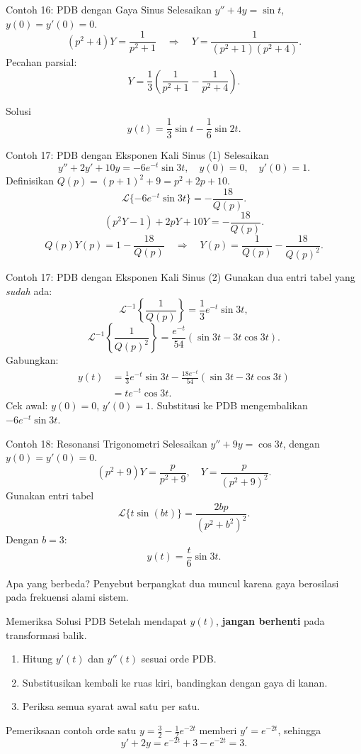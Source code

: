 \documentclass[aspectratio=169,11pt]{beamer}
\newcommand{\Lap}{\mathcal{L}}
\newcommand{\invLap}{\mathcal{L}^{-1}}
\begin{document}
\begin{frame}{Contoh 16: PDB dengan Gaya Sinus}
Selesaikan $y''+4y=\sin t$, $y(0)=y'(0)=0$.
\[
(p^2+4)Y=\frac1{p^2+1}
\quad\Rightarrow\quad
Y=\frac1{(p^2+1)(p^2+4)}.
\]
Pecahan parsial:
\[
Y=\frac13\left(\frac1{p^2+1}-\frac1{p^2+4}\right).
\]
\begin{exampleblock}{Solusi}
\[
\boxed{y(t)=\frac13\sin t-\frac16\sin2t}.
\]
\end{exampleblock}
\end{frame}

\begin{frame}{Contoh 17: PDB dengan Eksponen Kali Sinus (1)}
Selesaikan
\[
y''+2y'+10y=-6e^{-t}\sin3t,
\quad y(0)=0,\quad y'(0)=1.
\]
\small Definisikan $Q(p)=(p+1)^2+9=p^2+2p+10$.
\[
\Lap\{-6e^{-t}\sin3t\}=-\frac{18}{Q(p)}.
\]
\[
(p^2Y-1)+2pY+10Y=-\frac{18}{Q(p)}.
\]
\[
Q(p)Y(p)=1-\frac{18}{Q(p)}
\quad\Longrightarrow\quad
\boxed{Y(p)=\frac1{Q(p)}-\frac{18}{Q(p)^2}}.
\]
\end{frame}

\begin{frame}{Contoh 17: PDB dengan Eksponen Kali Sinus (2)}
Gunakan dua entri tabel yang \emph{sudah} ada:
\[
\invLap\left\{\frac1{Q(p)}\right\}
=\frac13e^{-t}\sin3t,
\]
\[
\invLap\left\{\frac1{Q(p)^2}\right\}
=\frac{e^{-t}}{54}(\sin3t-3t\cos3t).
\]
Gabungkan:
\[
\begin{aligned}
y(t)&=\frac13e^{-t}\sin3t
-\frac{18e^{-t}}{54}(\sin3t-3t\cos3t)\\
&=\boxed{t e^{-t}\cos3t}.
\end{aligned}
\]
\small Cek awal: $y(0)=0$, $y'(0)=1$. Substitusi ke PDB mengembalikan $-6e^{-t}\sin3t$.
\end{frame}

\begin{frame}{Contoh 18: Resonansi Trigonometri}
Selesaikan $y''+9y=\cos3t$, dengan $y(0)=y'(0)=0$.
\[
(p^2+9)Y=\frac{p}{p^2+9},
\quad Y=\frac{p}{(p^2+9)^2}.
\]
Gunakan entri tabel
\[
\Lap\{t\sin(bt)\}=\frac{2bp}{(p^2+b^2)^2}.
\]
Dengan $b=3$:
\[
\boxed{y(t)=\frac t6\sin3t}.
\]
\begin{block}{Apa yang berbeda?}
Penyebut berpangkat dua muncul karena gaya berosilasi pada frekuensi alami sistem.
\end{block}
\end{frame}

\begin{frame}{Memeriksa Solusi PDB}
Setelah mendapat $y(t)$, \textbf{jangan berhenti} pada transformasi balik.
\begin{enumerate}
\item Hitung $y'(t)$ dan $y''(t)$ sesuai orde PDB.
\item Substitusikan kembali ke ruas kiri, bandingkan dengan gaya di kanan.
\item Periksa semua syarat awal satu per satu.
\end{enumerate}
\begin{exampleblock}{Pemeriksaan contoh orde satu}
$y=\frac32-\frac12e^{-2t}$ memberi $y'=e^{-2t}$, sehingga
\[
y'+2y=e^{-2t}+3-e^{-2t}=3.
\]
\end{exampleblock}
\end{frame}
\end{document}
